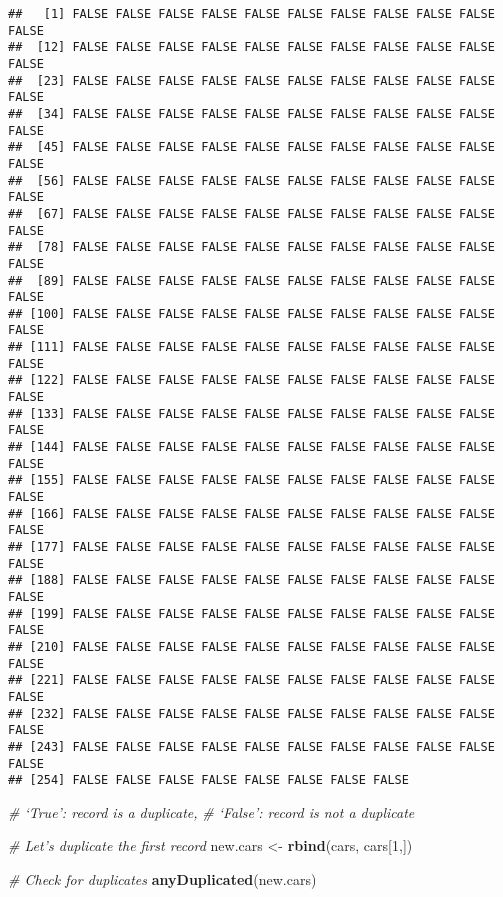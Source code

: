 \documentclass[11pt,]{article}
\newenvironment{Shaded}{\begin{snugshade}}{\end{snugshade}}
\newcommand{\CommentTok}[1]{\textcolor[rgb]{0.56,0.35,0.01}{\textit{#1}}}
\newcommand{\DecValTok}[1]{\textcolor[rgb]{0.00,0.00,0.81}{#1}}
\newcommand{\KeywordTok}[1]{\textcolor[rgb]{0.13,0.29,0.53}{\textbf{#1}}}
\newcommand{\NormalTok}[1]{#1}
\newcommand{\StringTok}[1]{\textcolor[rgb]{0.31,0.60,0.02}{#1}}
\begin{document}
\begin{verbatim}
##   [1] FALSE FALSE FALSE FALSE FALSE FALSE FALSE FALSE FALSE FALSE FALSE
##  [12] FALSE FALSE FALSE FALSE FALSE FALSE FALSE FALSE FALSE FALSE FALSE
##  [23] FALSE FALSE FALSE FALSE FALSE FALSE FALSE FALSE FALSE FALSE FALSE
##  [34] FALSE FALSE FALSE FALSE FALSE FALSE FALSE FALSE FALSE FALSE FALSE
##  [45] FALSE FALSE FALSE FALSE FALSE FALSE FALSE FALSE FALSE FALSE FALSE
##  [56] FALSE FALSE FALSE FALSE FALSE FALSE FALSE FALSE FALSE FALSE FALSE
##  [67] FALSE FALSE FALSE FALSE FALSE FALSE FALSE FALSE FALSE FALSE FALSE
##  [78] FALSE FALSE FALSE FALSE FALSE FALSE FALSE FALSE FALSE FALSE FALSE
##  [89] FALSE FALSE FALSE FALSE FALSE FALSE FALSE FALSE FALSE FALSE FALSE
## [100] FALSE FALSE FALSE FALSE FALSE FALSE FALSE FALSE FALSE FALSE FALSE
## [111] FALSE FALSE FALSE FALSE FALSE FALSE FALSE FALSE FALSE FALSE FALSE
## [122] FALSE FALSE FALSE FALSE FALSE FALSE FALSE FALSE FALSE FALSE FALSE
## [133] FALSE FALSE FALSE FALSE FALSE FALSE FALSE FALSE FALSE FALSE FALSE
## [144] FALSE FALSE FALSE FALSE FALSE FALSE FALSE FALSE FALSE FALSE FALSE
## [155] FALSE FALSE FALSE FALSE FALSE FALSE FALSE FALSE FALSE FALSE FALSE
## [166] FALSE FALSE FALSE FALSE FALSE FALSE FALSE FALSE FALSE FALSE FALSE
## [177] FALSE FALSE FALSE FALSE FALSE FALSE FALSE FALSE FALSE FALSE FALSE
## [188] FALSE FALSE FALSE FALSE FALSE FALSE FALSE FALSE FALSE FALSE FALSE
## [199] FALSE FALSE FALSE FALSE FALSE FALSE FALSE FALSE FALSE FALSE FALSE
## [210] FALSE FALSE FALSE FALSE FALSE FALSE FALSE FALSE FALSE FALSE FALSE
## [221] FALSE FALSE FALSE FALSE FALSE FALSE FALSE FALSE FALSE FALSE FALSE
## [232] FALSE FALSE FALSE FALSE FALSE FALSE FALSE FALSE FALSE FALSE FALSE
## [243] FALSE FALSE FALSE FALSE FALSE FALSE FALSE FALSE FALSE FALSE FALSE
## [254] FALSE FALSE FALSE FALSE FALSE FALSE FALSE FALSE
\end{verbatim}

\begin{Shaded}
\begin{Highlighting}[]
  \CommentTok{# ‘True’: record is a duplicate,}
  \CommentTok{# ‘False’: record is not a duplicate}
  
  \CommentTok{# Let's duplicate the first record}
\NormalTok{  new.cars <-}\StringTok{ }\KeywordTok{rbind}\NormalTok{(cars, cars[}\DecValTok{1}\NormalTok{,])}
  
  \CommentTok{# Check for duplicates}
  \KeywordTok{anyDuplicated}\NormalTok{(new.cars)}
\end{Highlighting}
\end{Shaded}
\end{document}
